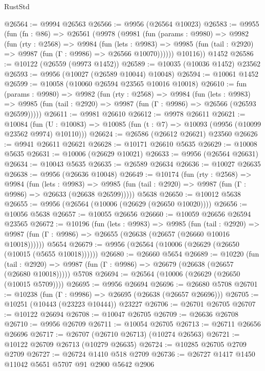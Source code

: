 \begin{lexlean}{RustStd}
\begin{coremodule}
@26564 := @9994 @26563
@26566 := @9956 (@26564 @10023)
@26583 := @9955
    (fun (fn : @86) =>
    @26561
      (@9978
        (@9981
          (fun (params : @9980) =>
          @9982
            (fun (rty : @2568) =>
            @9984
              (fun (lets : @9983) =>
              @9985 (fun (tail : @2920) => @9987 (fun (Γ : @9986) => @26566 @10070))))))
        @10116))
    @1452
@26586 := @10122 (@26559 (@9973 @1452))
@26589 := @10035 (@10036 @1452) @23562
@26593 := @9956 (@10027 (@26589 @10044) @10048)
@26594 := @10061 @1452
@26599 := @10058 (@10060 @26594 @23565 @10016 @10018)
@26610 := fun (params : @9980) =>
  @9982
    (fun (rty : @2568) =>
    @9984
      (fun (lets : @9983) =>
      @9985 (fun (tail : @2920) => @9987 (fun (Γ : @9986) => @26566 (@26593 @26599)))))
@26611 := @9981 @26610
@26612 := @9978 @26611
@26621 := @10084
    (fun (U : @10083) => @10085 (fun (t : @7) => @10093 (@9956 (@10099 @23562 @9974) @10110)))
@26624 := @26586 (@26612 @26621) @23560
@26626 := @9941 @26611 @26621
@26628 := @10171 @26610 @5635
@26629 := @10008 @5635
@26631 := @10006 (@26629 @10021)
@26633 := @9956 (@26564 @26631)
@26634 := @10043 @5635
@26635 := @26589 @26634
@26636 := @10027 @26635
@26638 := @9956 (@26636 @10048)
@26649 := @10174
    (fun (rty : @2568) =>
    @9984
      (fun (lets : @9983) =>
      @9985 (fun (tail : @2920) => @9987 (fun (Γ : @9986) => @26633 (@26638 @26599)))))
    @5638
@26650 := @10012 @5638
@26655 := @9956 (@26564 (@10006 (@26629 (@26650 @10020))))
@26656 := @10056 @5638
@26657 := @10055 @26656
@26660 := @10059 @26656 @26594 @23565
@26672 := @10196
    (fun (lets : @9983) =>
    @9985
      (fun (tail : @2920) =>
      @9987 (fun (Γ : @9986) => @26655 (@26638 (@26657 (@26660 @10016 @10018))))))
    @5654
@26679 := @9956 (@26564 (@10006 (@26629 (@26650 (@10015 (@5655 @10018))))))
@26680 := @26660 @5654
@26689 := @10220
    (fun (tail : @2920) => @9987 (fun (Γ : @9986) => @26679 (@26638 (@26657 (@26680 @10018)))))
    @5708
@26694 := @26564 (@10006 (@26629 (@26650 (@10015 @5709))))
@26695 := @9956 @26694
@26696 := @26680 @5708
@26701 := @10238 (fun (Γ : @9986) => @26695 (@26638 (@26657 @26696)))
@26705 := @10251 (@10443 (@23223 @10444)) @23227
@26706 := @26701 @26705
@26707 := @10122 @26694
@26708 := @10047 @26705
@26709 := @26636 @26708
@26710 := @9956 @26709
@26711 := @10054 @26705
@26713 := @26711 @26656 @26696
@26717 := @26707 (@26710 @26713) (@10274 @26563)
@26721 := @10122 @26709 @26713 (@10279 @26635)
@26724 := @10285 @26705 @2709 @2709
@26727 := @26724 @1410 @518 @2709
@26736 := @26727 @1417 @1450 @11042 @5651 @5707 @91 @2900 @5642 @2906

\end{coremodule}
\end{lexlean}
